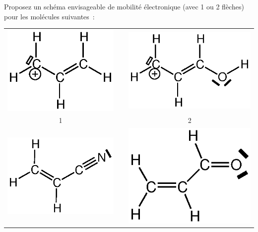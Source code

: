 \vrule

\clearpage


Proposez un sch\'ema envisageable de mobilit\'e \'electronique (avec 1 ou 2 fl\`eches) pour
les mol\'ecules suivantes~:

\begin{center}
\begin{tabular}{ccc}
\includegraphics[scale=0.7]{figure/ex2meso1.eps} & \, & \includegraphics[scale=0.7]{figure/ex2meso2.eps} \\
1&&2\\[0.2cm]
\includegraphics[scale=0.7]{figure/ex2meso3.eps} & \, & \includegraphics[scale=0.7]{figure/acrolein.eps} \\

\end{tabular}
\end{center}
